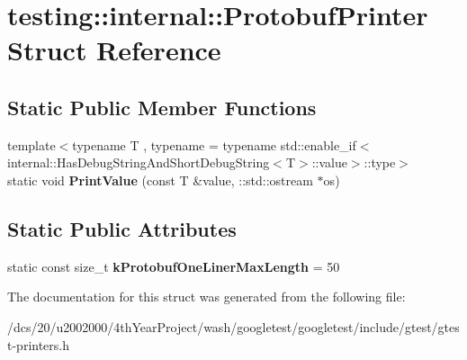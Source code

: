 \hypertarget{structtesting_1_1internal_1_1ProtobufPrinter}{}\section{testing\+:\+:internal\+:\+:Protobuf\+Printer Struct Reference}
\label{structtesting_1_1internal_1_1ProtobufPrinter}
\subsection*{Static Public Member Functions}
\begin{DoxyCompactItemize}
\item 
\mbox{\label{structtesting_1_1internal_1_1ProtobufPrinter_aece7a06d21d98c5b26c3ab7f21137bae}} 
{\footnotesize template$<$typename T , typename  = typename std\+::enable\+\_\+if$<$                internal\+::\+Has\+Debug\+String\+And\+Short\+Debug\+String$<$\+T$>$\+::value$>$\+::type$>$ }\\static void {\bfseries Print\+Value} (const T \&value, \+::std\+::ostream $\ast$os)
\end{DoxyCompactItemize}
\subsection*{Static Public Attributes}
\begin{DoxyCompactItemize}
\item 
\mbox{\label{structtesting_1_1internal_1_1ProtobufPrinter_a3635cec91980f5908c4e2078af7d181c}} 
static const size\+\_\+t {\bfseries k\+Protobuf\+One\+Liner\+Max\+Length} = 50
\end{DoxyCompactItemize}


The documentation for this struct was generated from the following file\+:\begin{DoxyCompactItemize}
\item 
/dcs/20/u2002000/4th\+Year\+Project/wash/googletest/googletest/include/gtest/gtest-\/printers.\+h\end{DoxyCompactItemize}
